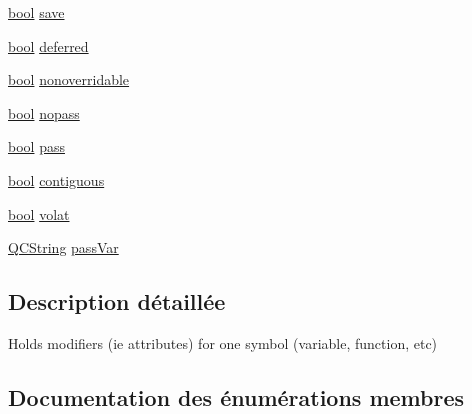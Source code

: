\begin{DoxyCompactItemize}
\item 
\hyperlink{qglobal_8h_a1062901a7428fdd9c7f180f5e01ea056}{bool} \hyperlink{struct_symbol_modifiers_a25d1321a621eb7496f4e2e3ac99b0842}{save}
\item 
\hyperlink{qglobal_8h_a1062901a7428fdd9c7f180f5e01ea056}{bool} \hyperlink{struct_symbol_modifiers_a2aad749396a02ead46410d78da584e9a}{deferred}
\item 
\hyperlink{qglobal_8h_a1062901a7428fdd9c7f180f5e01ea056}{bool} \hyperlink{struct_symbol_modifiers_a1500769a8e0054bb142980765556c923}{nonoverridable}
\item 
\hyperlink{qglobal_8h_a1062901a7428fdd9c7f180f5e01ea056}{bool} \hyperlink{struct_symbol_modifiers_adcd51442f97dbef24a66a86ecd231fda}{nopass}
\item 
\hyperlink{qglobal_8h_a1062901a7428fdd9c7f180f5e01ea056}{bool} \hyperlink{struct_symbol_modifiers_af73c8f692ea33c3d1250adc8e4a1b946}{pass}
\item 
\hyperlink{qglobal_8h_a1062901a7428fdd9c7f180f5e01ea056}{bool} \hyperlink{struct_symbol_modifiers_af53aa7a23a005f7e861977192ea549ad}{contiguous}
\item 
\hyperlink{qglobal_8h_a1062901a7428fdd9c7f180f5e01ea056}{bool} \hyperlink{struct_symbol_modifiers_a6034722aa4017fca0054462b41b4aa97}{volat}
\item 
\hyperlink{class_q_c_string}{Q\+C\+String} \hyperlink{struct_symbol_modifiers_aa087f0ac7c16038e40ba11ad1b66c635}{pass\+Var}
\end{DoxyCompactItemize}


\subsection{Description détaillée}
Holds modifiers (ie attributes) for one symbol (variable, function, etc) 

\subsection{Documentation des énumérations membres}
\hypertarget{struct_symbol_modifiers_aceec8152eeb6c06b8dbe03ef14fed6a4}{}
